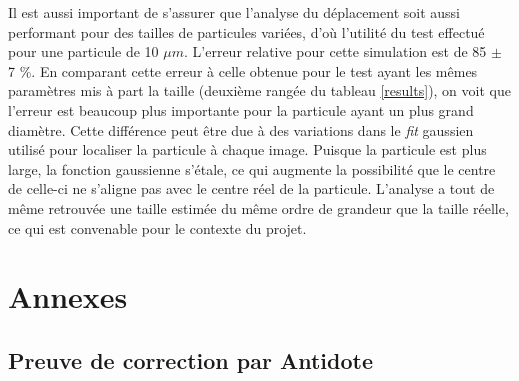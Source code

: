 \documentclass[conference]{IEEEtran}
\begin{document}
Il est aussi important de s'assurer que l'analyse du déplacement soit aussi performant pour des tailles de particules variées, d'où l'utilité du test 
effectué pour une particule de 10 $\mu m$. L'erreur relative pour cette simulation est de 85 $\pm$ 7 \%. En comparant cette erreur à celle obtenue pour le test ayant les mêmes paramètres mis à part la taille (deuxième
rangée du tableau \ref{results}), on voit que l'erreur est beaucoup plus importante pour la particule ayant un plus grand diamètre. Cette différence peut être due à des variations dans le \textit{fit} gaussien utilisé pour localiser
la particule à chaque image. Puisque la particule est plus large, la fonction gaussienne s'étale, ce qui augmente la possibilité que le centre de celle-ci ne s'aligne pas
avec le centre réel de la particule. L'analyse a tout de même retrouvée une taille estimée du même ordre de grandeur que la taille réelle, ce qui est convenable pour le contexte du projet.

\printbibliography

\clearpage

\section{Annexes}

\subsection{Preuve de correction par Antidote}

\clearpage
\end{document}
